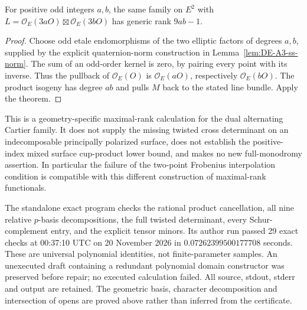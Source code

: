 \begin{corollary}
\label{cor:DE-SS-odd-rectangle-dual-rank}
For positive odd integers \(a,b\), the same family on
\(E^2\) with \(L=\mathcal O_E(3aO)\boxtimes
\mathcal O_E(3bO)\) has generic rank \(9ab-1\).
\end{corollary}
\begin{proof}
Choose odd etale endomorphisms of the two elliptic factors
of degrees \(a,b\), supplied by the explicit quaternion-norm
construction in Lemma~\ref{lem:DE-A3-ss-norm}. The
sum of an odd-order kernel is zero, by pairing every point
with its inverse. Thus the pullback of \(\mathcal O_E(O)\)
is \(\mathcal O_E(aO)\), respectively \(\mathcal O_E(bO)\).
The product isogeny has degree \(ab\) and pulls \(M\) back
to the stated line bundle. Apply the theorem.
\end{proof}

\begin{remark}
\label{rem:DE-SS-cross-scope}
This is a geometry-specific maximal-rank calculation for the
dual alternating Cartier family. It does not supply the missing
twisted cross determinant on an indecomposable principally
polarized surface, does not establish the positive-index mixed
surface cup-product lower bound, and makes no new full-monodromy
assertion. In particular the failure of the two-point Frobenius
interpolation condition is compatible with this different
construction of maximal-rank functionals.

The standalone exact program
checks the rational product cancellation, all nine relative
\(p\)-basis decompositions, the full twisted determinant,
every Schur-complement entry, and the explicit tensor minors.
Its author run passed 29 exact checks at 00:37:10 UTC on
20 November 2026 in \(0.07262399500177708\) seconds.
These are universal polynomial identities, not finite-parameter
samples. An unexecuted draft containing a redundant polynomial
domain constructor was preserved before repair; no executed
calculation failed. All source, stdout, stderr and output are
retained. The geometric basis, character decomposition and
intersection of opens are proved above rather than inferred
from the certificate.
\end{remark}
